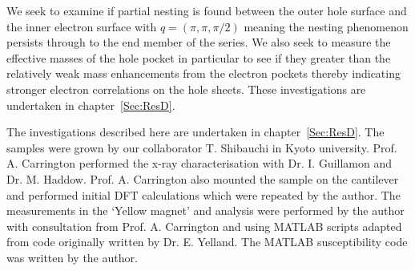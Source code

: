 We seek to examine if partial nesting is found between the outer hole surface and the inner electron surface with $q=(\pi, \pi, \pi/2)$ meaning the nesting phenomenon persists through to the end member of the series. We also seek to measure the effective masses of the hole pocket in particular to see if they greater than the relatively weak mass enhancements from the electron pockets thereby indicating stronger electron correlations on the hole sheets. These investigations are undertaken in chapter~\ref{Sec:ResD}.

The investigations described here are undertaken in chapter~\ref{Sec:ResD}. The samples were grown by our collaborator T. Shibauchi in Kyoto university. Prof. A. Carrington performed the x-ray characterisation with Dr. I. Guillamon and Dr. M. Haddow. Prof. A. Carrington also mounted the sample on the cantilever and performed initial \ac{DFT} calculations which were repeated by the author. The measurements in the `Yellow magnet' and analysis were performed by the author with consultation from Prof. A. Carrington and using MATLAB scripts adapted from code originally written by Dr. E. Yelland. The MATLAB susceptibility code was written by the author.





